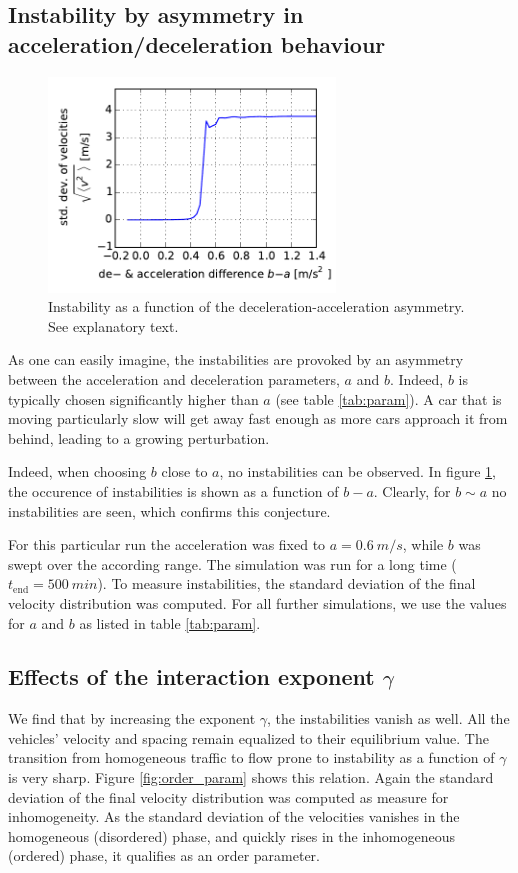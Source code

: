 \subsection{Instability by asymmetry in acceleration/deceleration behaviour}
\label{sec:asymm}

\begin{figure}
    \centering
    \includegraphics[width=3in]{../img/order_parameter_delta_acceleration.pdf}
    \caption{Instability as a function of the deceleration-acceleration asymmetry. See explanatory text.}
    \label{fig:order_parameter_delta_acceleration}
\end{figure}
As one can easily imagine, the instabilities are provoked by an asymmetry between the acceleration and deceleration parameters, $a$ and $b$. Indeed, $b$ is typically chosen significantly higher than $a$ (see table \ref{tab:param}). A car that is moving particularly slow will get away fast enough as more cars approach it from behind, leading to a growing perturbation.

Indeed, when choosing $b$ close to $a$, no instabilities can be observed. In figure \ref{fig:order_parameter_delta_acceleration}, the occurence of instabilities is shown as a function of $b-a$. Clearly, for $b\sim a$ no instabilities are seen, which confirms this conjecture.

 For this particular run the acceleration was fixed to $a=\SI{0.6}{m/s}$, while $b$ was swept over the according range. The simulation was run for a long time ($t_\mathrm{end} = \SI{500}{min}$). To measure instabilities, the standard deviation of the final velocity distribution was computed. For all further simulations, we use the values for $a$ and $b$ as listed in table \ref{tab:param}.

\subsection{Effects of the interaction exponent $\gamma$}
We find that by increasing the exponent $\gamma$, the instabilities vanish as well. All the vehicles' velocity and spacing remain equalized to their equilibrium value. The transition from homogeneous traffic to flow prone to instability as a function of $\gamma$ is very sharp. Figure \ref{fig:order_param} shows this relation. Again the standard deviation of the final velocity distribution was computed as measure for inhomogeneity. As the standard deviation of the velocities vanishes in the homogeneous (disordered) phase, and quickly rises in the inhomogeneous (ordered) phase, it qualifies as an order parameter.

